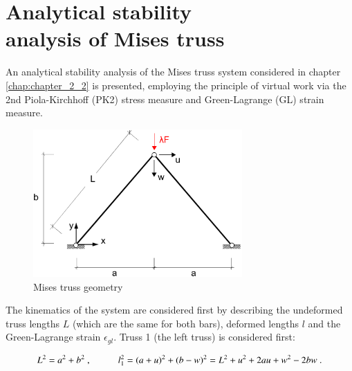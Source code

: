 
\chapter[Analytical stability analysis of Mises truss]{Analytical stability\\ analysis of Mises truss}
\label{app:Analytical stability analysis of Mises truss}
\renewcommand{\Thema}{Analytical stability analysis of Mises truss}

An analytical stability analysis of the Mises truss system considered in chapter \ref{chap:chapter_2_2} is presented, employing the principle of virtual work via the 2nd Piola-Kirchhoff (PK2) stress measure and Green-Lagrange (GL) strain measure.

\begin{figure}[H]
	\centering
	\def\svgwidth{\columnwidth}
	\includegraphics[width=8cm]{images/mises_truss_def.png}
	\caption{Mises truss geometry}
	\label{pic:app0}
\end{figure}

The kinematics of the system are considered first by describing the undeformed truss lengths $L$ (which are the same for both bars), deformed lengths $l$ and the Green-Lagrange strain $\epsilon_{gl}$. Truss 1 (the left truss) is considered first:

\begin{equation} 
L^2 = a^2 + b^2\ ,
\hspace{10mm}
l_1^2 = (a+u)^2 + (b-w)^2 = L^2 + u^2 + 2au +w^2 -2bw
\label{eqapp0_1}\ .
\end{equation}

